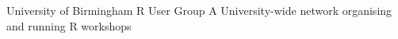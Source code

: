 {University of Birmingham}
{R User Group}
{A University-wide network organising and running R workshops}